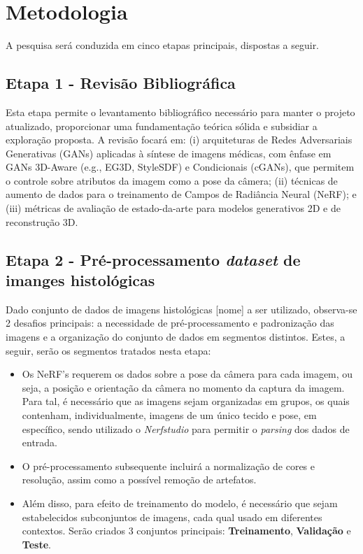 \section{Metodologia}

A pesquisa será conduzida em cinco etapas principais, dispostas a seguir.


\subsection{Etapa 1 - Revisão Bibliográfica}

Esta etapa permite o levantamento bibliográfico necessário para manter o projeto atualizado, proporcionar uma fundamentação teórica sólida e subsidiar a exploração proposta. A revisão focará em: (i) arquiteturas de Redes Adversariais Generativas (GANs) aplicadas à síntese de imagens médicas, com ênfase em GANs 3D-Aware (e.g., EG3D, StyleSDF) e Condicionais (cGANs), que permitem o controle sobre atributos da imagem como a pose da câmera; (ii) técnicas de aumento de dados para o treinamento de Campos de Radiância Neural (NeRF); e (iii) métricas de avaliação de estado-da-arte para modelos generativos 2D e de reconstrução 3D.


\subsection{Etapa 2 - Pré-processamento \textit{dataset} de imanges histológicas}

Dado conjunto de dados de imagens histológicas [nome] a ser utilizado, observa-se 2 desafios principais: a necessidade de pré-processamento e padronização das imagens e a organização do conjunto de dados em segmentos distintos. Estes, a seguir, serão os segmentos tratados nesta etapa:

\begin{itemize}
  \item Os NeRF's requerem os dados sobre a pose da câmera para cada imagem, ou seja, a posição e orientação da câmera no momento da captura da imagem. Para tal, é necessário que as imagens sejam organizadas em grupos, os quais contenham, individualmente, imagens de um único tecido e pose, em específico, sendo utilizado o \textit{Nerfstudio} para permitir o \textit{parsing} dos dados de entrada. 
  \item O pré-processamento subsequente incluirá a normalização de cores e resolução, assim como a possível remoção de artefatos. 
  \item  Além disso, para efeito de treinamento do modelo, é necessário que sejam estabelecidos subconjuntos de imagens, cada qual usado em diferentes contextos. Serão criados 3 conjuntos principais: \textbf{Treinamento}, \textbf{Validação} e \textbf{Teste}.
  \end{itemize}

